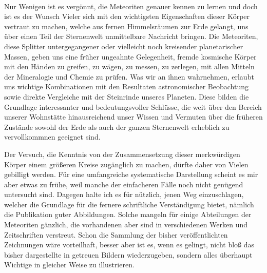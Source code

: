 \documentclass[a4paper, 11pt, oneside, polutonikogreek, german]{article}
\begin{document}
\paragraph*{}
Nur Wenigen ist es vergönnt, die Meteoriten genauer kennen zu lernen und doch ist es der Wunsch Vieler sich mit den wichtigsten Eigenschaften dieser Körper vertraut zu machen, welche aus fernen Himmelsräumen zur Erde gelangt, uns über einen Teil der Sternenwelt unmittelbare Nachricht bringen. Die Meteoriten, diese Splitter untergegangener oder vielleicht noch kreisender planetarischer Massen, geben uns eine früher ungeahnte Gelegenheit, fremde kosmische Körper mit den Händen zu greifen, zu wägen, zu messen, zu zerlegen, mit allen Mitteln der Mineralogie und Chemie zu prüfen. Was wir an ihnen wahrnehmen, erlaubt uns wichtige Kombinationen mit den Resultaten astronomischer Beobachtung sowie direkte Vergleiche mit der Steinrinde unseres Planeten. Diese bilden die Grundlage interessanter und bedeutungsvoller Schlüsse, die weit über den Bereich unserer Wohnstätte hinausreichend unser Wissen und Vermuten über die früheren Zustände sowohl der Erde als auch der ganzen Sternenwelt erheblich zu vervollkommnen geeignet sind.

Der Versuch, die Kenntnis von der Zusammensetzung dieser merkwürdigen Körper einem größeren Kreise zugänglich zu machen, dürfte daher von Vielen gebilligt werden. Für eine umfangreiche systematische Darstellung scheint es mir aber etwas zu frühe, weil manche der einfacheren Fälle noch nicht genügend untersucht sind. Dagegen halte ich es für nützlich, jenen Weg einzuschlagen, welcher die Grundlage für die fernere schriftliche Verständigung bietet, nämlich die Publikation guter Abbildungen. Solche mangeln für einige Abteilungen der Meteoriten gänzlich, die vorhandenen aber sind in verschiedenen Werken und Zeitschriften verstreut. Schon die Sammlung der bisher veröffentlichten Zeichnungen wäre vorteilhaft, besser aber ist es, wenn es gelingt, nicht bloß das bisher dargestellte in getreuen Bildern wiederzugeben, sondern alles überhaupt Wichtige in gleicher Weise zu illustrieren.
\end{document}
